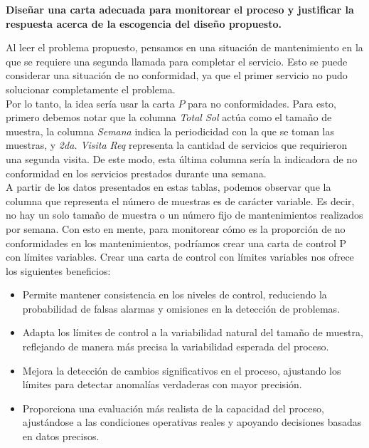 \documentclass{article}
\begin{document}
\textbf{Diseñar una carta adecuada para monitorear el proceso y justificar la respuesta acerca de la escogencia del diseño propuesto.}

\vspace{0.5cm}

Al leer el problema propuesto, pensamos en una situación de mantenimiento en la que se requiere una segunda llamada para completar el servicio. Esto se puede considerar una situación de no conformidad, ya que el primer servicio no pudo solucionar completamente el problema.\\

Por lo tanto, la idea sería usar la carta $P$ para no conformidades. Para esto, primero debemos notar que la columna \textit{Total Sol} actúa como el tamaño de muestra, la columna \textit{Semana} indica la periodicidad con la que se toman las muestras, y \textit{2da. Visita Req} representa la cantidad de servicios que requirieron una segunda visita. De este modo, esta última columna sería la indicadora de no conformidad en los servicios prestados durante una semana.\\

A partir de los datos presentados en estas tablas, podemos observar que la columna que representa el número de muestras es de carácter variable. Es decir, no hay un solo tamaño de muestra o un número fijo de mantenimientos realizados por semana. Con esto en mente, para monitorear cómo es la proporción de no conformidades en los mantenimientos, podríamos crear una carta de control P con límites variables. Crear una carta de control con límites variables nos ofrece los siguientes beneficios:\\

\begin{itemize}
    \item Permite mantener consistencia en los niveles de control, reduciendo la probabilidad de falsas alarmas y omisiones en la detección de problemas.
    \item Adapta los límites de control a la variabilidad natural del tamaño de muestra, reflejando de manera más precisa la variabilidad esperada del proceso.
    \item Mejora la detección de cambios significativos en el proceso, ajustando los límites para detectar anomalías verdaderas con mayor precisión.
    \item Proporciona una evaluación más realista de la capacidad del proceso, ajustándose a las condiciones operativas reales y apoyando decisiones basadas en datos precisos.
\end{itemize}
\end{document}
